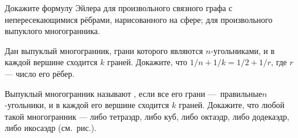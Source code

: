 \documentclass[a4paper,11pt]{article}
\begin{document}
 Докажите формулу Эйлера
 для произвольного
связного графа с непересекающимися р\"ебра\-ми,
нарисованного на сфере;
 для произвольного
выпуклого многогранника.

Дан выпуклый многогранник, грани которого являются $n$-угольниками,
и в каж\-дой вершине сходится $k$ граней. Докажите, что
$1/n+1/k=1/2+1/r$, где $r$ --- число его р\"ебер.

\vspace*{.1truecm}


\vspace*{.2truecm}

Выпуклый многогранник называют , если
все его грани ---~\hbox{правильные}\break $n$-угольники, и
в каждой его вершине сходится $k$ граней. Докажите,
что любой такой многогранник --- либо
тетраэдр, либо куб, либо октаэдр, либо додекаэдр,
либо икосаэдр (см.~рис.).





\end{document}

